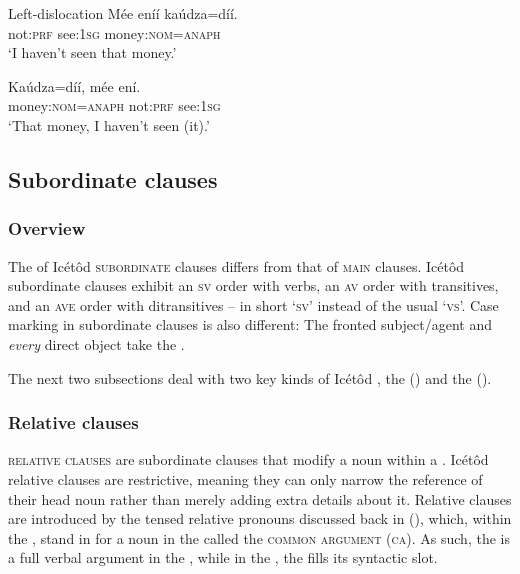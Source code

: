 Left-dislocation
\ea\label{ex:syn:33}
\gll Mée   eníí     kaúdza=díí. \\
not:\textsc{prf}   see:\textsc{1sg}   money:\textsc{nom}=\textsc{anaph}    \\
\glt ‘I haven’t seen that money.’ 
\z




\ea\label{ex:syn:34}
\gll Kaúdza=díí,     mée     ení. \\
money:\textsc{nom}=\textsc{anaph}   not:\textsc{prf}   see:\textsc{1sg}    \\
\glt ‘That money, I haven’t seen (it).’ 
\z






\subsection{Subordinate clauses}\label{sec:10.3}
\subsubsection{Overview}\label{sec:10.3.1}

The  of Icétôd \textsc{subordinate} clauses differs from that of \textsc{main} clauses. Icétôd subordinate clauses exhibit an \textsc{sv} order with  verbs, an \textsc{av} order with transitives, and an \textsc{ave} order with ditransitives – in short ‘\textsc{sv}’ instead of the usual ‘\textsc{vs}’. Case marking in subordinate clauses is also different: The fronted subject/agent and \textit{every} direct object take the . 

The next two subsections deal with two key kinds of Icétôd , the  () and the  ().


\subsubsection{Relative clauses}\label{sec:10.3.2}

\textsc{relative clauses} are subordinate clauses that modify a noun within a . Icétôd relative clauses are restrictive, meaning they can only narrow the reference of their head noun rather than merely adding extra details about it. Relative clauses are introduced by the tensed relative pronouns discussed back in (), which, within the , stand in for a noun in the  called the \textsc{common argument} (\textsc{ca}). As such, the  is a full verbal argument in the , while in the , the  fills its syntactic slot.

